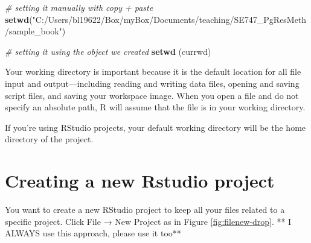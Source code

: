 \documentclass[
]{book}
\newenvironment{Shaded}{\begin{snugshade}}{\end{snugshade}}
\newcommand{\CommentTok}[1]{\textcolor[rgb]{0.56,0.35,0.01}{\textit{#1}}}
\newcommand{\KeywordTok}[1]{\textcolor[rgb]{0.13,0.29,0.53}{\textbf{#1}}}
\newcommand{\NormalTok}[1]{#1}
\newcommand{\StringTok}[1]{\textcolor[rgb]{0.31,0.60,0.02}{#1}}
\begin{document}
\begin{Shaded}
\begin{Highlighting}[]
\CommentTok{# setting it manually with copy + paste}
\KeywordTok{setwd}\NormalTok{(}\StringTok{"C:/Users/bl19622/Box/myBox/Documents/teaching/SE747_PgResMeth/sample_book"}\NormalTok{)}

\CommentTok{#  setting it using the object we created}
\KeywordTok{setwd}\NormalTok{ (currwd)}
\end{Highlighting}
\end{Shaded}

Your working directory is important because it is the default location
for all file input and output---including reading and writing data files,
opening and saving script files, and saving your workspace image. When
you open a file and do not specify an absolute path, R will assume that
the file is in your working directory.

If you're using RStudio projects, your default working directory will be the home directory of the project.

\hypertarget{creating-a-new-rstudio-project}{%
\section{Creating a new Rstudio project}\label{creating-a-new-rstudio-project}}

You want to create a new RStudio project to keep all your files related to a specific project.
Click File → New Project as in Figure \ref{fig:filenew-drop}. ** I ALWAYS use this approach, please use it too**
\end{document}

